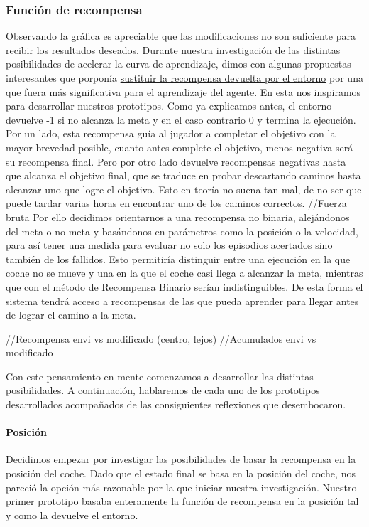 \subsubsection*{Función de recompensa}
Observando la gráfica es apreciable que las modificaciones no son suficiente para recibir los resultados deseados.
Durante nuestra investigación de las distintas posibilidades de acelerar la curva de aprendizaje, dimos con algunas propuestas interesantes que porponía \href{ https://medium.com/@ts1829/solving-mountain-car-with-q-learning-b77bf71b1de2}{sustituir la recompensa devuelta por el entorno} por una que fuera más significativa para el aprendizaje del agente. En esta nos inspiramos para desarrollar nuestros prototipos.
Como ya explicamos antes, el entorno devuelve -1 si no alcanza la meta y en el caso contrario 0 y termina la ejecución. 
Por un lado, esta recompensa guía al jugador a completar el objetivo con la mayor brevedad posible, cuanto antes complete el objetivo, menos negativa será su recompensa final.
Pero por otro lado devuelve recompensas negativas hasta que alcanza el objetivo final, que se traduce en probar descartando caminos hasta alcanzar uno que logre el objetivo. Esto en teoría no suena tan mal, de no ser que puede tardar varias horas en encontrar uno de los caminos correctos. 
//Fuerza bruta 
Por ello decidimos orientarnos a una recompensa no binaria, alejándonos del meta o no-meta y basándonos en parámetros como la posición o la velocidad, para así tener una medida para evaluar no solo los episodios acertados sino también de los fallidos. Esto permitiría distinguir entre una ejecución en la que coche no se mueve y una en la que el coche casi llega a alcanzar la meta, mientras que con el método de Recompensa Binario serían indistinguibles. De esta forma el sistema tendrá acceso a recompensas de las que pueda aprender para llegar antes de lograr el camino a la meta. 

//Recompensa envi vs modificado (centro, lejos)
//Acumulados envi vs modificado

Con este pensamiento en mente comenzamos a desarrollar las distintas posibilidades. A continuación, hablaremos de cada uno de los prototipos desarrollados acompañados de las consiguientes reflexiones que desembocaron.



\paragraph{Posición}
 Decidimos empezar por investigar las posibilidades de basar la recompensa en la posición del coche.
 Dado que el estado final se basa en la posición del coche, nos pareció la opción más razonable por la que iniciar nuestra investigación. Nuestro primer prototipo basaba enteramente la función de recompensa en la posición tal y como la devuelve el entorno. 

